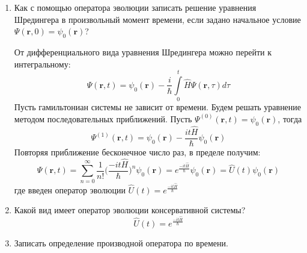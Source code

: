 \documentclass{article}
\begin{document}
\begin{enumerate}
	\item {Как с помощью оператора эволюции записать решение уравнения Шредингера в произвольный момент времени, если задано начальное условие $\Psi(\textbf{r}, 0) = \psi_0(\textbf{r}) $?}
	
	От дифференциального вида уравнения Шредингера можно перейти к интегральному:
	\begin{equation}
		\Psi(\textbf{r}, t) = \psi_0(\textbf{r}) - \frac{i}{\hbar} \int\limits_0^t \hat{H} \Psi(\textbf{r}, \tau) d\tau
	\end{equation}
	Пусть гамильтониан системы не зависит от времени. Будем решать уравнение методом последовательных приближений. Пусть $\Psi^{(0)}(\textbf{r}, t) = \psi_0 (\textbf{r})$, тогда
	\begin{equation}
		\Psi^{(1)}(\textbf{r}, t) = \psi_0 (\textbf{r}) - \frac{it\hat{H} }{\hbar} \psi_0 (\textbf{r})
	\end{equation}
	Повторяя приближение бесконечное число раз, в пределе получим:
	\begin{equation}
		\Psi(\textbf{r}, t) = \sum\limits_{n=0}^\infty \frac{1}{n!} \Big(\frac{-it\hat{H} }{\hbar} \Big)^n \psi_0 (\textbf{r}) = e^{\frac{-it\hat{H} }{\hbar}} \psi_0 (\textbf{r}) = \hat{U}(t) \psi_0 (\textbf{r})
	\end{equation}
	где введен оператор эволюции $\hat{U}(t) = e^{\frac{-it\hat{H} }{\hbar}}$
	
	\item {Какой вид имеет оператор эволюции консервативной системы?}
	\begin{equation}
		\hat{U}(t) = e^{\frac{-it\hat{H} }{\hbar}}
	\end{equation}
	
	\item {Записать определение производной оператора по времени.}
		

\end{enumerate}
\end{document}
